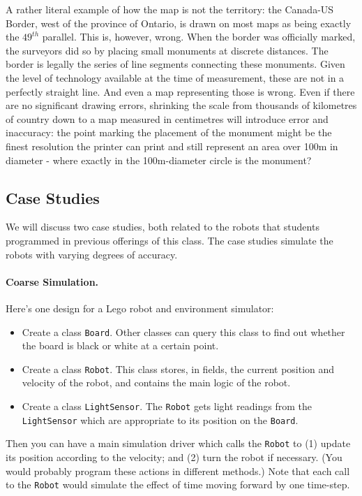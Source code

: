 A rather literal example of how the map is not the territory: the Canada-US Border, west of the province of Ontario, is drawn on most maps as being exactly the $49^{th}$ parallel. This is, however, wrong. When the border was officially marked, the surveyors did so by placing small monuments at discrete distances. The border is legally the series of line segments connecting these monuments. Given the level of technology available at the time of measurement, these are not in a perfectly straight line. And even a map representing those is wrong. Even if there are no significant drawing errors, shrinking the scale from thousands of kilometres of country down to a map measured in centimetres will introduce error and inaccuracy: the point marking the placement of the monument might be the finest resolution the printer can print and still represent an area over 100m in diameter - where exactly in the 100m-diameter circle is the monument?


\subsection*{Case Studies}
We will discuss two case studies, both related to the robots that
students programmed in previous offerings of this class. The case
studies simulate the robots with varying degrees of accuracy.

\paragraph{Coarse Simulation.} Here's one design for a Lego robot and
environment simulator: 

\begin{itemize}
\item Create a class {\tt Board}. Other classes can query this 
class to find out whether the board is black or white
at a certain point.
\item Create a class {\tt Robot}. This class stores, in fields, the
  current position and velocity of the robot, and contains the main
  logic of the robot.
\item Create a class {\tt LightSensor}. The {\tt Robot} gets light
readings from the {\tt LightSensor} which are appropriate to its
position on the {\tt Board}.
\end{itemize}

Then you can have a main simulation driver which calls the {\tt Robot}
to (1) update its position according to the velocity; and (2) turn the
robot if necessary. (You would probably program these actions in
different methods.) Note that each call to the {\tt Robot} would
simulate the effect of time moving forward by one time-step.

